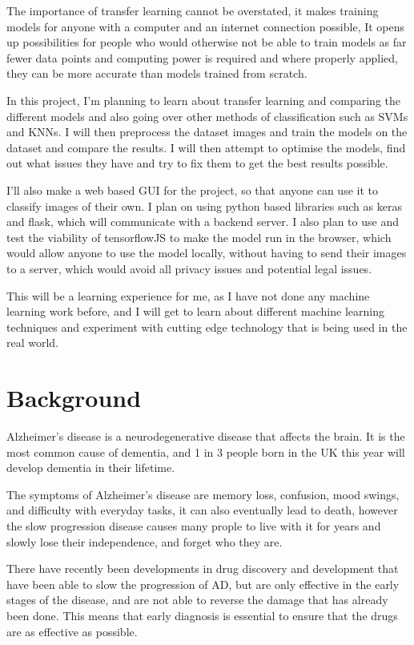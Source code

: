 \documentclass[]{final_report}
\begin{document}
The importance of transfer learning cannot be overstated, it makes training models for anyone with a computer and an internet connection possible, It opens up possibilities for people who would otherwise not be able to train models as far fewer data points and computing power is required and where properly applied, they can be more accurate than models trained from scratch.

In this project, I'm planning to learn about transfer learning and comparing the different models and also going over other methods of classification such as SVMs and KNNs. I will then preprocess the dataset images and train the models on the dataset and compare the results. I will then attempt to optimise the models, find out what issues they have and try to fix them to get the best results possible.

I'll also make a web based GUI for the project, so that anyone can use it to classify images of their own. I plan on using python based libraries such as keras and flask, which will communicate with a backend server. I also plan to use and test the viability of tensorflowJS\cite{smilkov2019tensorflowjs} to make the model run in the browser, which would allow anyone to use the model locally, without having to send their images to a server, which would avoid all privacy issues and potential legal issues.

This will be a learning experience for me, as I have not done any machine learning work before, and I will get to learn about different machine learning techniques and experiment with cutting edge technology that is being used in the real world.

\section{Background}
Alzheimer's disease is a neurodegenerative disease that affects the brain. It is the most common cause of dementia, and 1 in 3 people born in the UK this year will develop dementia in their lifetime.\cite{DementiaStatistics}

The symptoms of Alzheimer's disease are memory loss, confusion, mood swings, and difficulty with everyday tasks, it can also eventually lead to death, however the slow progression disease causes many prople to live with it for years and slowly lose their independence, and forget who they are.

There have recently been developments in drug discovery and development that have been able to slow the progression of AD, but are only effective in the early stages of the disease, and are not able to reverse the damage that has already been done. This means that early diagnosis is essential to ensure that the drugs are as effective as possible.\cite{Van_Dyck2022-pt}
\end{document}
